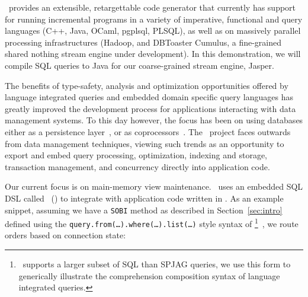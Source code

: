 
\compiler\ provides an extensible, retargettable code generator that currently
has support for running incremental programs in a variety of imperative,
functional and query languages (C++, Java, OCaml, pgplsql, PLSQL), as well as on
massively parallel processing infrastructures (Hadoop, and DBToaster Cumulus, a
fine-grained shared nothing stream engine under development). In this
demonstration, we will compile SQL queries to Java for our coarse-grained stream
engine, Jasper.


The benefits of type-safety, analysis and optimization opportunities offered by
language integrated queries and embedded domain specific query languages has
greatly improved the development process for applications interacting with data
management systems. To this day however, the focus has been on using databases
either as a persistence layer~\cite{wiedermann-popl:07}, or as
coprocessors~\cite{grust-sigmod:09}. The \compiler\ project faces outwards from
data management techniques, viewing such trends as an opportunity to export and
embed query processing, optimization, indexing and storage, transaction
management, and concurrency directly into application code.



Our current focus is on main-memory view maintenance. \compiler\ uses an
embedded SQL DSL called \dsl\ (\dslurl) to integrate with application code
written in \targetlang. As an example snippet, assuming we have a
\texttt{SOBI} method as described in Section~\ref{sec:intro} defined using the
\texttt{query.from(\ldots).where(\ldots).list(\ldots)} style syntax of \dsl
\footnote{\dsl\ supports a larger subset of SQL than SPJAG queries,
we use this form to generically illustrate the comprehension composition
syntax of language integrated queries.}\ , we route orders based on connection
state:

